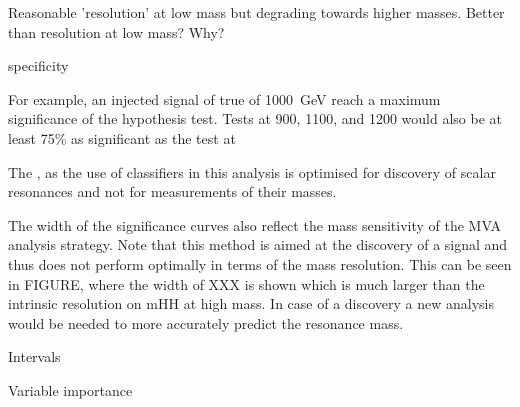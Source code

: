 Reasonable 'resolution' at low mass but degrading towards higher
masses. Better than \mHH resolution at low mass? Why?

specificity




For example, an injected signal of true \mX of \SI{1000}{\GeV} reach a
maximum significance of the hypothesis test. Tests at 900, 1100, and
1200 would also be at least 75\% as significant as the test at


The , as the use of classifiers in this analysis is optimised for
discovery of scalar resonances and not for measurements of their
masses.

The width of the significance curves also reflect the mass sensitivity
of the MVA analysis strategy. Note that this method is aimed at the
discovery of a signal and thus does not perform optimally in terms of
the mass resolution. This can be seen in FIGURE, where the width of
XXX is shown which is much larger than the intrinsic resolution on mHH
at high mass. In case of a discovery a new analysis would be needed to
more accurately predict the resonance mass.


\begin{table}[htbp]
  \centering

  

  \caption{Intervals}
  \label{tab:pnn_width}
\end{table}


Variable importance


